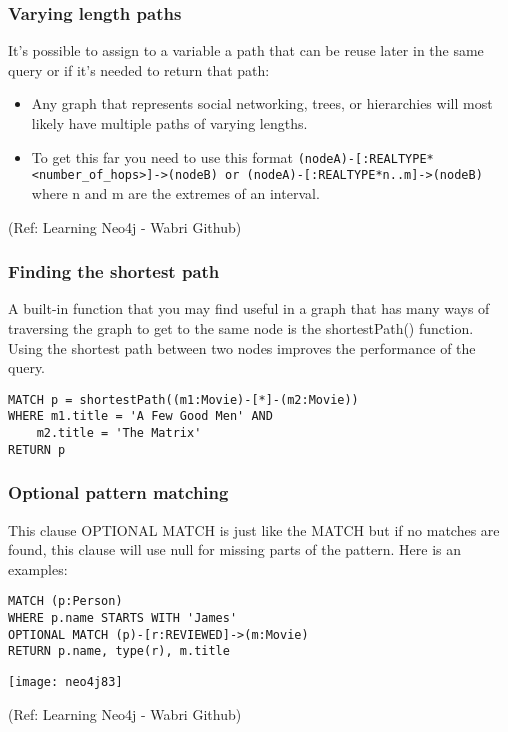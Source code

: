 \begin{frame}[fragile]\frametitle{Varying length paths}

It's possible to assign to a variable a path that can be reuse later in the same query or if it's needed to return that path:


\begin{itemize}
\item Any graph that represents social networking, trees, or hierarchies will most likely have multiple paths of varying lengths.

\item To get this far you need to use this format \lstinline|(nodeA)-[:REALTYPE*<number_of_hops>]->(nodeB) or (nodeA)-[:REALTYPE*n..m]->(nodeB)| where n and m are the extremes of an interval.
\end{itemize}

{\tiny (Ref: Learning Neo4j - Wabri Github)}
\end{frame}

\begin{frame}[fragile]\frametitle{Finding the shortest path}

A built-in function that you may find useful in a graph that has many ways of traversing the graph to get to the same node is the shortestPath() function. Using the shortest path between two nodes improves the performance of the query.

\begin{lstlisting}
MATCH p = shortestPath((m1:Movie)-[*]-(m2:Movie))
WHERE m1.title = 'A Few Good Men' AND
    m2.title = 'The Matrix'
RETURN p
\end{lstlisting}

\end{frame}

\begin{frame}[fragile]\frametitle{Optional pattern matching}
This clause OPTIONAL MATCH is just like the MATCH but if no matches are found, this clause will use null for missing parts of the pattern. Here is an examples:

\begin{lstlisting}
MATCH (p:Person)
WHERE p.name STARTS WITH 'James'
OPTIONAL MATCH (p)-[r:REVIEWED]->(m:Movie)
RETURN p.name, type(r), m.title
\end{lstlisting}


\begin{center}
\texttt{[image: neo4j83]}
\end{center}	


{\tiny (Ref: Learning Neo4j - Wabri Github)}
\end{frame}

